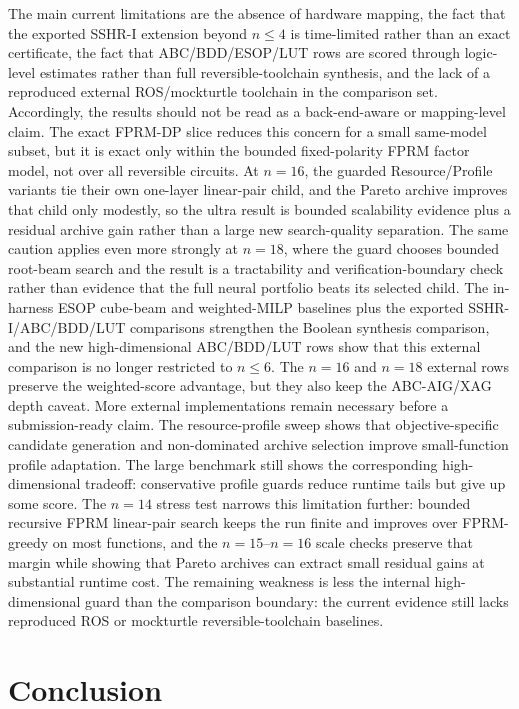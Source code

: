 \documentclass[11pt]{article}
\begin{document}
The main current limitations are the absence of hardware mapping, the fact that
the exported SSHR-I extension beyond $n\leq 4$ is time-limited rather than an
exact certificate, the fact that ABC/BDD/ESOP/LUT rows are scored through
logic-level estimates rather than full reversible-toolchain synthesis, and the
lack of a reproduced external ROS/mockturtle toolchain in the comparison set.
Accordingly, the results should not be read as a back-end-aware or
mapping-level claim.
The exact FPRM-DP slice reduces this concern for a small same-model subset, but
it is exact only within the bounded fixed-polarity FPRM factor model, not over
all reversible circuits.
At $n=16$, the guarded Resource/Profile variants tie their own one-layer
linear-pair child, and the Pareto archive improves that child only modestly, so
the ultra result is bounded scalability evidence plus a residual archive gain
rather than a large new search-quality separation.  The same caution applies even more
strongly at $n=18$, where the guard chooses bounded root-beam search and the
result is a tractability and verification-boundary check rather than evidence
that the full neural portfolio beats its selected child.
The in-harness ESOP cube-beam and weighted-MILP baselines plus the exported
SSHR-I/ABC/BDD/LUT comparisons strengthen the Boolean synthesis comparison, and
the new high-dimensional ABC/BDD/LUT rows show that this external comparison is
no longer restricted to $n\leq 6$.  The $n=16$ and $n=18$ external rows preserve
the weighted-score advantage, but they also keep the ABC-AIG/XAG depth caveat.
More external implementations remain necessary before a submission-ready claim.
The resource-profile sweep shows that objective-specific candidate generation
and non-dominated archive selection improve small-function profile adaptation.
The large benchmark still shows the corresponding high-dimensional tradeoff:
conservative profile guards reduce runtime tails but give up some score.  The
$n=14$ stress test narrows this limitation further: bounded recursive FPRM
linear-pair search keeps the run finite and improves over FPRM-greedy on most
functions, and the $n=15$--$n=16$ scale checks preserve that margin while
showing that Pareto archives can extract small residual gains at substantial
runtime cost.  The remaining weakness is less the internal high-dimensional
guard than the comparison boundary: the current evidence still lacks
reproduced ROS or mockturtle reversible-toolchain
baselines.

\section{Conclusion}
\end{document}

